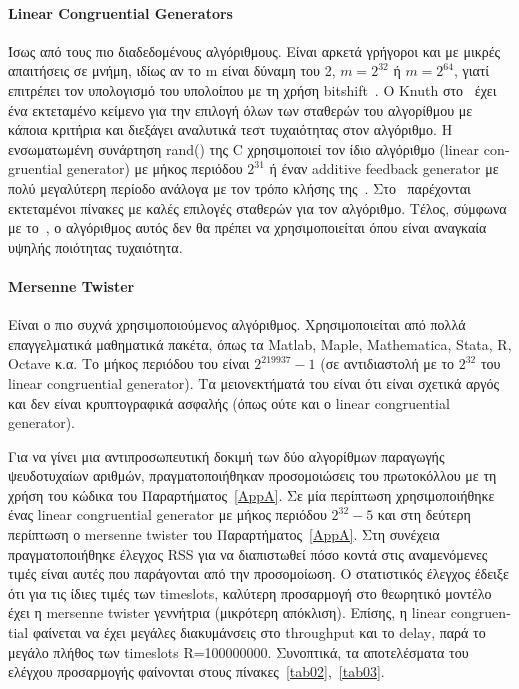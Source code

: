 \documentclass[12pt]{report}
\begin{document}
\paragraph{\textlatin{Linear Congruential Generators}} Ίσως από τους πιο διαδεδομένους αλγόριθμους. Είναι αρκετά γρήγοροι και με μικρές απαιτήσεις σε μνήμη, ιδίως αν το \textlatin{m} είναι δύναμη του 2, \(m=2^{32}\) ή \(m=2^{64}\), γιατί επιτρέπει τον υπολογισμό του υπολοίπου με τη χρήση \textlatin{bitshift}~\cite{wiki:01}. O Knuth στο~\cite{book:06} έχει ένα εκτεταμένο κείμενο για την επιλογή όλων των σταθερών του αλγορίθμου με κάποια κριτήρια και διεξάγει αναλυτικά τεστ τυχαιότητας στον αλγόριθμο. Η ενσωματωμένη συνάρτηση \textlatin{rand()} της \textlatin{C} χρησιμοποιεί τον ίδιο αλγόριθμο (\textlatin{linear congruential generator}) με μήκος περιόδου \(2^{31}\) ή έναν \textlatin{additive feedback generator} με πολύ μεγαλύτερη περίοδο ανάλογα με τον τρόπο κλήσης της~\cite{wiki:01}. Στο~\cite{paper:11} παρέχονται εκτεταμένοι πίνακες με καλές επιλογές σταθερών για τον αλγόριθμο. Τέλος, σύμφωνα με το~\cite{wiki:01}, ο αλγόριθμος αυτός δεν θα πρέπει να χρησιμοποιείται όπου είναι αναγκαία υψηλής ποιότητας τυχαιότητα.

\paragraph{\textlatin{Mersenne Twister}}
Είναι ο πιο συχνά χρησιμοποιούμενος αλγόριθμος. Χρησιμοποιείται από πολλά επαγγελματικά μαθηματικά πακέτα, όπως τα \textlatin{Matlab, Maple, Mathematica, Stata, R, Octave} κ.α. Το μήκος περιόδου του είναι \(2^{219937}-1\) (σε αντιδιαστολή με το \(2^{32}\) του \textlatin{linear congruential generator}). Τα μειονεκτήματά του είναι ότι είναι σχετικά αργός και δεν είναι κρυπτογραφικά ασφαλής (όπως ούτε και ο \textlatin{linear congruential generator}).

Για να γίνει μια αντιπροσωπευτική δοκιμή των δύο αλγορίθμων παραγωγής ψευδοτυχαίων αριθμών, πραγματοποιήθηκαν προσομοιώσεις του πρωτοκόλλου με τη χρήση του κώδικα του Παραρτήματος~\ref{AppA}. Σε μία περίπτωση χρησιμοποιήθηκε ένας \textlatin{linear congruential generator} με μήκος περιόδου \(2^{32}-5\) και στη δεύτερη περίπτωση ο \textlatin{mersenne twister} του Παραρτήματος~\ref{AppA}. Στη συνέχεια πραγματοποιήθηκε έλεγχος \textlatin{RSS} για να διαπιστωθεί πόσο κοντά στις αναμενόμενες τιμές είναι αυτές που παράγονται από την προσομοίωση. Ο στατιστικός έλεγχος έδειξε ότι για τις ίδιες τιμές των \textlatin{timeslots}, καλύτερη προσαρμογή στο θεωρητικό μοντέλο έχει η \textlatin{mersenne twister} γεννήτρια (μικρότερη απόκλιση). Επίσης, η \textlatin{linear congruential} φαίνεται να έχει μεγάλες διακυμάνσεις στο \textlatin{throughput} και το \textlatin{delay}, παρά το μεγάλο πλήθος των \textlatin{timeslots R=100000000}. Συνοπτικά, τα αποτελέσματα του ελέγχου προσαρμογής φαίνονται στους πίνακες~\ref{tab02},~\ref{tab03}.
\end{document}
